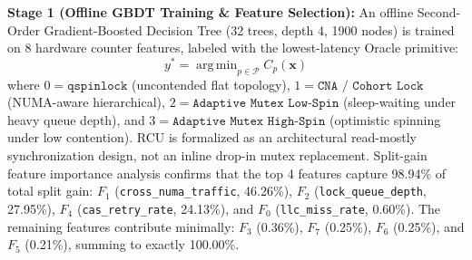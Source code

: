 \documentclass[conference]{IEEEtran}
\begin{document}
\textbf{Stage 1 (Offline GBDT Training \& Feature Selection):} An offline Second-Order Gradient-Boosted Decision Tree (32 trees, depth 4, 1900 nodes) is trained on 8 hardware counter features, labeled with the lowest-latency Oracle primitive:
\begin{equation}
y^* = \operatorname{arg\,min}_{p \in \mathcal{P}} C_p(\mathbf{x}) \label{eq:oracle}
\end{equation}
where $0 = \texttt{qspinlock}$ (uncontended flat topology), $1 = \texttt{CNA / Cohort Lock}$ (NUMA-aware hierarchical), $2 = \texttt{Adaptive Mutex Low-Spin}$ (sleep-waiting under heavy queue depth), and $3 = \texttt{Adaptive Mutex High-Spin}$ (optimistic spinning under low contention). RCU is formalized as an architectural read-mostly synchronization design, not an inline drop-in mutex replacement. Split-gain feature importance analysis confirms that the top 4 features capture 98.94\% of total split gain: $F_1$ (\texttt{cross\_numa\_traffic}, 46.26\%), $F_2$ (\texttt{lock\_queue\_depth}, 27.95\%), $F_4$ (\texttt{cas\_retry\_rate}, 24.13\%), and $F_0$ (\texttt{llc\_miss\_rate}, 0.60\%). The remaining features contribute minimally: $F_3$ (0.36\%), $F_7$ (0.25\%), $F_6$ (0.25\%), and $F_5$ (0.21\%), summing to exactly 100.00\%.
\end{document}
